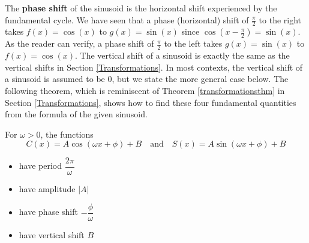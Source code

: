 \vspace{-.05in}

The \textbf{phase shift} of the sinusoid is the horizontal shift experienced by the fundamental cycle. We have seen that a phase (horizontal) shift of $\frac{\pi}{2}$ to the right takes $f(x) = \cos(x)$ to $g(x) = \sin(x)$ since $\cos\left(x - \frac{\pi}{2}\right) = \sin(x)$.  As the reader can verify,  a phase shift of $\frac{\pi}{2}$ to the left takes $g(x) = \sin(x)$ to $f(x)= \cos(x)$.   The vertical shift of a sinusoid is exactly the same as the vertical shifts in Section \ref{Transformations}.  In most contexts, the vertical shift of a sinusoid is assumed to be $0$, but we state the more general case below.  The following theorem, which is reminiscent of Theorem \ref{transformationsthm} in Section \ref{Transformations}, shows how to find these four fundamental quantities from the formula of the given sinusoid.

\smallskip

\colorbox{ResultColor}{\bbm

\begin{thm}  \label{sinusoidform} For $\omega > 0$, the functions \[C(x) = A \cos(\omega x + \phi) + B \quad \text{and} \quad S(x) = A \sin(\omega x + \phi) + B \]

\begin{multicols}{2}

\begin{itemize}

\item  have period $\dfrac{2\pi}{\omega}$

\item  have amplitude $|A|$

\item  have phase shift $-\dfrac{\phi}{\omega}$

\item  have vertical shift $B$

\end{itemize}

\end{multicols}

\vspace{1pt}

\vspace{-.12in}

\end{thm}

\ebm}

